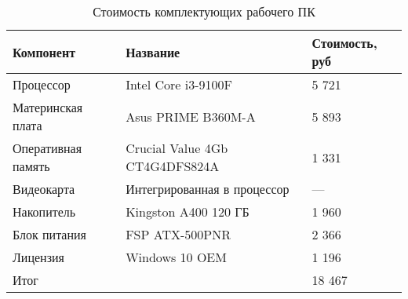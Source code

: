\begin{table}[t]
    \centering
    \caption{Стоимость комплектующих рабочего ПК}
    \label{tab:pc_price}
    \begin{tabu}to \linewidth{X[m]X[2.2,c,m]X[r,m]}
        \toprule
        Компонент & Название & Стоимость, руб \\
        \midrule
        Процессор          & Intel Core i3-9100F            & 5 721 \\
        Материнская плата  & Asus PRIME B360M-A             & 5 893 \\
        Оперативная память & Crucial Value 4Gb CT4G4DFS824A & 1 331 \\
        Видеокарта         & Интегрированная в процессор    & —     \\
        Накопитель         & Kingston A400 120 ГБ           & 1 960 \\
        Блок питания       & FSP ATX-500PNR                 & 2 366 \\
        Лицензия           & Windows 10 OEM                 & 1 196 \\
        \midrule
        Итог & & 18 467 \\
        \bottomrule
    \end{tabu}
\end{table}
